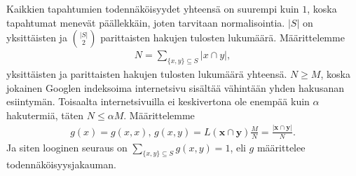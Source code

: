 \documentclass[12pt,finnish]{tktltiki2}
\theoremstyle{definition}
\theoremstyle{remark}
\begin{document}
      Kaikkien tapahtumien todennäköisyydet yhteensä on suurempi kuin $1$, koska tapahtumat menevät päällekkäin, joten tarvitaan normalisointia.
      $|S|$ on yksittäisten ja $\binom{|S|}{2}$ parittaisten hakujen tulosten lukumäärä.
      Määrittelemme
      \begin{align}
        N = \sum_{\{x,y\} \subseteq S} |x \cap y|,
      \end{align}
      yksittäisten ja parittaisten hakujen tulosten lukumäärä yhteensä.
      $N \geq M$, koska jokainen Googlen indeksoima internetsivu sisältää vähintään yhden hakusanan esiintymän. Toisaalta internetsivuilla ei keskivertona ole enempää kuin $\alpha$ hakutermiä, täten $N \leq \alpha{}M$.
      Määrittelemme
      \begin{align}
        g(x) = g(x,x),\, g(x,y) = L(\mathbf{x} \cap \mathbf{y})\frac{M}{N} = \frac{|\mathbf{x}\cap \mathbf{y}|}{N}.
      \end{align}
      Ja siten looginen seuraus on $\sum_{\{x,y\}\subseteq S} g(x,y) = 1$, eli $g$ määrittelee todennäköisyysjakauman.
\end{document}
